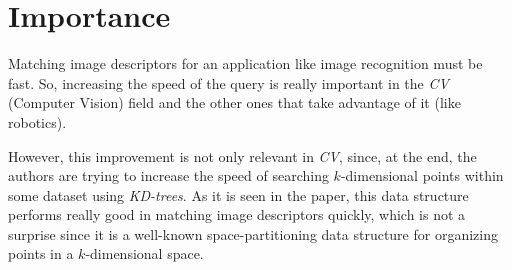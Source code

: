\section{Importance}
Matching image descriptors for an application like image recognition must be fast. So, increasing the speed of the query is really important in the \textit{CV} (Computer Vision) field and the other ones that take advantage of it (like robotics). 

However, this improvement is not only relevant in \textit{CV}, since, at the end, the authors are trying to increase the speed of searching $k$-dimensional points within some dataset using \textit{KD-trees}. As it is seen in the paper, this data structure performs really good in matching image descriptors quickly, which is not a surprise since it is a well-known space-partitioning data structure for organizing points in a $k$-dimensional space.
